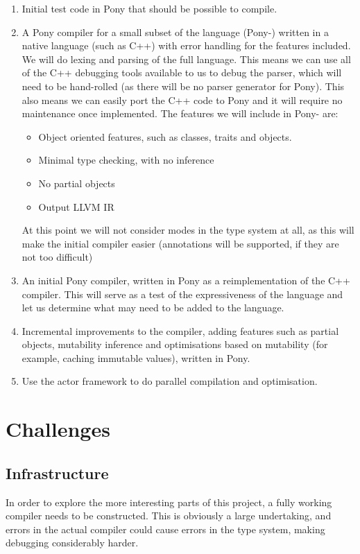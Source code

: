 \documentclass[11pt,a4paper]{report}
\begin{document}
\begin{enumerate}
	\item Initial test code in Pony that should be possible to compile.
	\item A Pony compiler for a small subset of the language (Pony-) written in a native language (such as C++) with error handling for the features included.
		We will do lexing and parsing of the full language.
		This means we can use all of the C++ debugging tools available to us to debug the parser, which will need to be hand-rolled (as there will be no parser generator for Pony).
		This also means we can easily port the C++ code to Pony and it will require no maintenance once implemented.
		The features we will include in Pony- are:
		\begin{itemize}[noitemsep]
			\item Object oriented features, such as classes, traits and objects.
			\item Minimal type checking, with no inference
			\item No partial objects
			\item Output LLVM IR
		\end{itemize}
	At this point we will not consider modes in the type system at all, as this will make the initial compiler easier (annotations will be supported, if they are not too difficult)
	\item An initial Pony compiler, written in Pony as a reimplementation of the C++ compiler.
		This will serve as a test of the expressiveness of the language and let us determine what may need to be added to the language.
	\item Incremental improvements to the compiler, adding features such as partial objects, mutability inference and optimisations based on mutability (for example, caching immutable values), written in Pony.
    	\item Use the actor framework to do parallel compilation and optimisation.
\end{enumerate}

\section{Challenges}

\subsection{Infrastructure}

In order to explore the more interesting parts of this project, a fully working compiler needs to be constructed.
This is obviously a large undertaking, and errors in the actual compiler could cause errors in the type system, making debugging considerably harder.
\end{document}
